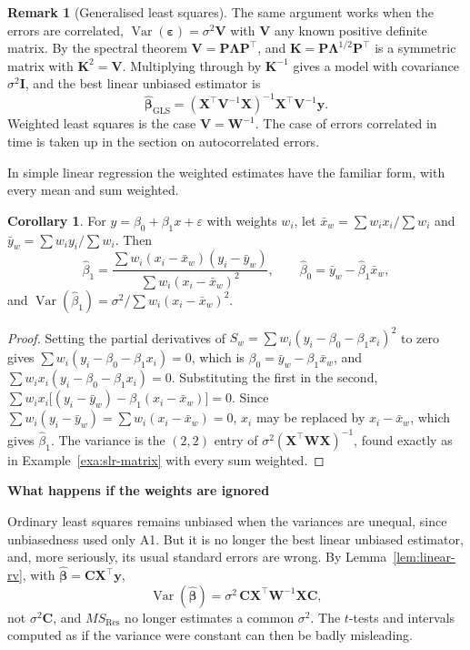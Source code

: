 \documentclass[11pt,a4paper]{article}
\numberwithin{equation}{section}
\theoremstyle{definition}
\newtheorem{coro}[thm]{Corollary}
\newtheorem*{remark}{Remark}
\newcommand{\subhead}[1]{%
  \par\medskip\noindent\textbf{#1}\par\nobreak\smallskip}
\begin{document}
\begin{remark}[Generalised least squares]
The same argument works when the errors are correlated, $\operatorname{Var}(\boldsymbol\varepsilon) = \sigma^2\mathbf{V}$
with $\mathbf{V}$ any known positive definite matrix. By the spectral theorem
$\mathbf{V} = \mathbf{P}\boldsymbol\Lambda\mathbf{P}^\top$, and $\mathbf{K} = \mathbf{P}\boldsymbol\Lambda^{1/2}\mathbf{P}^\top$
is a symmetric matrix with $\mathbf{K}^2 = \mathbf{V}$. Multiplying through by $\mathbf{K}^{-1}$ gives a
model with covariance $\sigma^2\mathbf{I}$, and the best linear unbiased estimator is
\[
\hat{\boldsymbol\beta}_{\mathrm{GLS}} = (\mathbf{X}^\top\mathbf{V}^{-1}\mathbf{X})^{-1}\mathbf{X}^\top\mathbf{V}^{-1}\mathbf{y} .
\]
Weighted least squares is the case $\mathbf{V} = \mathbf{W}^{-1}$. The case of errors correlated in
time is taken up in the section on autocorrelated errors.
\end{remark}

In simple linear regression the weighted estimates have the familiar form, with every mean and
sum weighted.

\begin{coro}\label{coro:wls-slr}
For $y = \beta_0 + \beta_1 x + \varepsilon$ with weights $w_i$, let
$\bar x_w = \sum w_i x_i/\sum w_i$ and $\bar y_w = \sum w_i y_i/\sum w_i$. Then
\[
\hat\beta_1 = \frac{\sum w_i(x_i - \bar x_w)(y_i - \bar y_w)}{\sum w_i(x_i - \bar x_w)^2} ,
\qquad
\hat\beta_0 = \bar y_w - \hat\beta_1\bar x_w ,
\]
and $\operatorname{Var}(\hat\beta_1) = \sigma^2\big/\sum w_i(x_i - \bar x_w)^2$.
\end{coro}

\begin{proof}
Setting the partial derivatives of $S_w = \sum w_i(y_i - \beta_0 - \beta_1 x_i)^2$ to zero gives
$\sum w_i(y_i - \beta_0 - \beta_1 x_i) = 0$, which is $\beta_0 = \bar y_w - \beta_1\bar x_w$, and
$\sum w_i x_i(y_i - \beta_0 - \beta_1 x_i) = 0$. Substituting the first in the second,
$\sum w_i x_i\bigl[(y_i - \bar y_w) - \beta_1(x_i - \bar x_w)\bigr] = 0$. Since
$\sum w_i(y_i - \bar y_w) = \sum w_i(x_i - \bar x_w) = 0$, $x_i$ may be replaced by $x_i - \bar x_w$,
which gives $\hat\beta_1$. The variance is the $(2,2)$ entry of $\sigma^2(\mathbf{X}^\top\mathbf{W}\mathbf{X})^{-1}$,
found exactly as in Example~\ref{exa:slr-matrix} with every sum weighted.
\end{proof}

\subhead{What happens if the weights are ignored}
Ordinary least squares remains unbiased when the variances are unequal, since unbiasedness used
only A1. But it is no longer the best linear unbiased estimator, and, more seriously, its usual
standard errors are wrong. By Lemma~\ref{lem:linear-rv}, with
$\hat{\boldsymbol\beta} = \mathbf{C}\mathbf{X}^\top\mathbf{y}$,
\[
\operatorname{Var}(\hat{\boldsymbol\beta}) = \sigma^2\,\mathbf{C}\mathbf{X}^\top\mathbf{W}^{-1}\mathbf{X}\mathbf{C} ,
\]
not $\sigma^2\mathbf{C}$, and $MS_{\mathrm{Res}}$ no longer estimates a common $\sigma^2$. The $t$-tests
and intervals computed as if the variance were constant can then be badly misleading.
\end{document}

